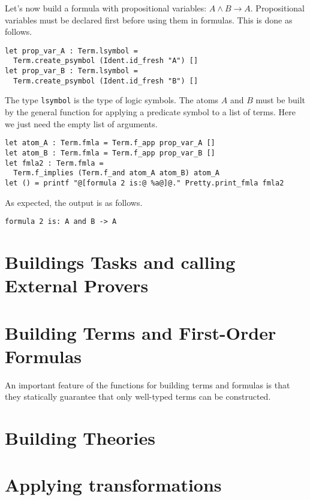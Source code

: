 Let's now build a formula with propositional variables: $A \land B
\rightarrow A$. Propositional variables must be declared first before
using them in formulas. This is done as follows.
\begin{verbatim}
let prop_var_A : Term.lsymbol = 
  Term.create_psymbol (Ident.id_fresh "A") []
let prop_var_B : Term.lsymbol = 
  Term.create_psymbol (Ident.id_fresh "B") []
\end{verbatim}
The type \texttt{lsymbol} is the type of logic symbols. The atoms $A$ and $B$
must be built by the general function for applying a predicate symbol to a list of terms. Here we just need the empty list of arguments.
\begin{verbatim}
let atom_A : Term.fmla = Term.f_app prop_var_A []
let atom_B : Term.fmla = Term.f_app prop_var_B []
let fmla2 : Term.fmla = 
  Term.f_implies (Term.f_and atom_A atom_B) atom_A
let () = printf "@[formula 2 is:@ %a@]@." Pretty.print_fmla fmla2
\end{verbatim}

As expected, the output is as follows.
\begin{verbatim}
formula 2 is: A and B -> A
\end{verbatim}

\section{Buildings Tasks and calling External Provers}

\section{Building Terms and First-Order Formulas}

An important feature of the functions for building terms and formulas
is that they statically guarantee that only well-typed terms can be
constructed.

\section{Building Theories}

\section{Applying transformations}

